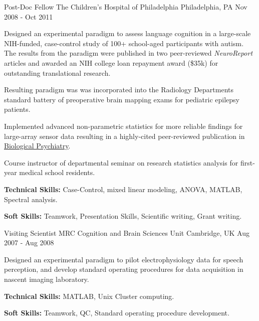 \begin{cventries}
  \cventry
  {Post-Doc Fellow} %
  {The Children's Hospital of Philadelphia} %
  {Philadelphia, PA} %
  {Nov 2008 - Oct 2011} %
  {
    \begin{cvitems} %
      \item {Designed an experimental paradigm to assess language cognition in a large-scale NIH-funded, case-control study of 100+ school-aged participants with autism. The results from the paradigm were published in two peer-reviewed \emph{NeuroReport} articles and awarded an NIH college loan repayment award (\$35k) for outstanding translational research.}
      \item {Resulting paradigm was was incorporated into the Radiology Departments standard battery of preoperative brain mapping exams for pediatric epilepsy patients.}
      \item {Implemented advanced non-parametric statistics for more reliable findings for large-array sensor data resulting in a highly-cited peer-reviewed publication in \href{https://doi.org/10.1016/j.biopsych.2011.01.015}{Biological Psychiatry}}. 
      \item {Course instructor of departmental seminar on research statistics analysis for first-year medical school residents.}
      \item {\textbf{Technical Skills:} Case-Control, mixed linear modeling, ANOVA, MATLAB, Spectral analysis.}
      \item {\textbf{Soft Skills:} Teamwork, Presentation Skills, Scientific writing, Grant writing.}
    \end{cvitems}
  }

  \cventry
  {Visiting Scientist} %
  {MRC Cognition and Brain Sciences Unit} %
  {Cambridge, UK} %
  {Aug 2007 - Aug 2008} %
  {
    \begin{cvitems} %
      \item {Designed an experimental paradigm to pilot electrophysiology data for speech perception, and develop standard operating procedures for data acquisition in nascent imaging laboratory.}
      \item {\textbf{Technical Skills:} MATLAB, Unix Cluster computing.}
      \item {\textbf{Soft Skills:} Teamwork, QC, Standard operating procedure development.}
    \end{cvitems}
  }

\end{cventries}
